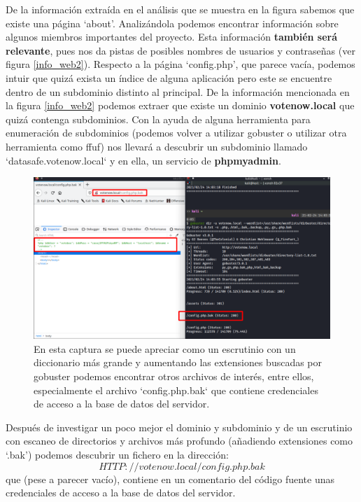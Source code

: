 De la información extraída en el análisis que se muestra en la figura \label{gobuster1} sabemos que existe una página `about'. Analizándola podemos encontrar información sobre algunos miembros importantes del proyecto. Esta información \textbf{también será relevante}, pues nos da pistas de posibles nombres de usuarios y contraseñas (ver figura \ref{info_web2}). Respecto a la página `config.php', que parece vacía, podemos intuir que quizá exista un índice de alguna aplicación pero este se encuentre dentro de un subdominio distinto al principal.  De la información mencionada en la figura \ref{info_web2} podemos extraer que existe un dominio \textbf{votenow.local} que quizá contenga subdominios. Con la ayuda de alguna herramienta para enumeración de subdominios (podemos volver a utilizar gobuster o utilizar otra herramienta como ffuf) nos llevará a descubrir un subdominio llamado `datasafe.votenow.local` y en ella, un servicio de \textbf{phpmyadmin}.

\begin{figure}[!hbt]
  \centering
  \includegraphics[width=\textwidth]{imagenes/php.back.png}
  \caption{En esta captura se puede apreciar como un escrutinio con un diccionario más grande y aumentando las extensiones buscadas por gobuster podemos encontrar otros archivos de interés, entre ellos, especialmente el archivo `config.php.bak` que contiene credenciales de acceso a la base de datos del servidor.}
   \label{php.back}
\end{figure}


Después de investigar un poco mejor el dominio y subdominio y de un escrutinio con escaneo de directorios y archivos más profundo (añadiendo extensiones como `.bak') podemos descubrir un fichero en la dirección: $$HTTP://votenow.local/config.php.bak$$ que (pese a parecer vacío), contiene en un comentario del código fuente unas credenciales de acceso a la base de datos del servidor.


